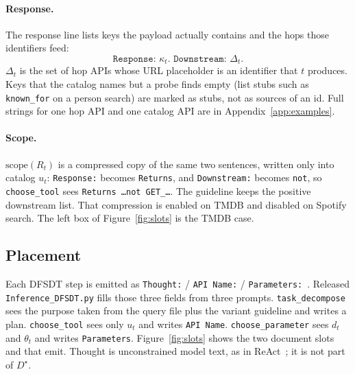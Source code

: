 \documentclass[11pt,a4paper]{article}
\begin{document}
\paragraph{Response.}
The response line lists keys the payload actually contains and the hops those identifiers feed:
\[
\texttt{Response: $\kappa_t$. Downstream: $\Delta_t$.}
\]
$\Delta_t$ is the set of hop APIs whose URL placeholder is an identifier that $t$ produces. Keys that the catalog names but a probe finds empty (list stubs such as \texttt{known\_for} on a person search) are marked as stubs, not as sources of an id. Full strings for one hop API and one catalog API are in Appendix~\ref{app:examples}.

\paragraph{Scope.}
$\mathrm{scope}(R_t)$ is a compressed copy of the same two sentences, written only into catalog $u_t$: \texttt{Response:} becomes \texttt{Returns}, and \texttt{Downstream:} becomes \texttt{not}, so \texttt{choose\_tool} sees \texttt{Returns \ldots not GET\_\ldots}. The guideline keeps the positive downstream list. That compression is enabled on TMDB and disabled on Spotify search. The left box of Figure~\ref{fig:slots} is the TMDB case.

\subsection{Placement}
\label{sec:slots}

Each DFSDT step is emitted as \texttt{Thought:} / \texttt{API Name:} / \texttt{Parameters:}~\cite{qin2024toollm}. Released \texttt{Inference\_DFSDT.py} fills those three fields from three prompts. \texttt{task\_decompose} sees the purpose taken from the query file plus the variant guideline and writes a plan. \texttt{choose\_tool} sees only $u_t$ and writes \texttt{API Name}. \texttt{choose\_parameter} sees $d_t$ and $\theta_t$ and writes \texttt{Parameters}. Figure~\ref{fig:slots} shows the two document slots and that emit. Thought is unconstrained model text, as in ReAct~\cite{yao2023react}; it is not part of $D^\star$.
\end{document}
